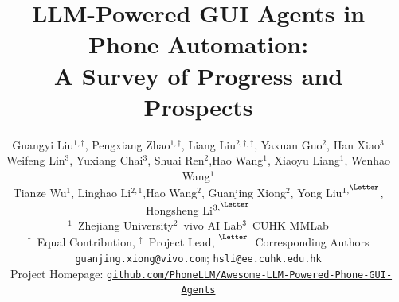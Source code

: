 \documentclass[10pt,journal, compsoc]{IEEEtran}
\begin{document}
\title{LLM-Powered GUI Agents in Phone Automation: \\A Survey of Progress and Prospects} 



\author{Guangyi Liu$^{1,\dag}$, Pengxiang Zhao$^{1,\dag}$, Liang Liu$^{2,\dag,\ddag}$, Yaxuan Guo$^2$, Han Xiao$^{3}$\\[-0.2ex]
Weifeng Lin$^{3}$, Yuxiang Chai$^{3}$, Shuai Ren$^2$,Hao Wang$^1$, Xiaoyu Liang$^1$, Wenhao Wang$^1$\\[-0.2ex] 
Tianze Wu$^1$, Linghao Li$^{2,1}$,Hao Wang$^2$, Guanjing Xiong$^2$, Yong Liu$^{1,\textsuperscript{\Letter}}$, Hongsheng Li$^{3,\textsuperscript{\Letter}}$  \\
\normalsize{$^1$~Zhejiang University\quad$^2$~vivo AI Lab\quad$^3$~CUHK MMLab} \\
\small{$^\dag$~Equal Contribution, \quad $^\ddag$~Project Lead, \quad $^{\textsuperscript{\Letter}}$~Corresponding Authors} \\
\texttt{\small guanjing.xiong@vivo.com}; \texttt{\small hsli@ee.cuhk.edu.hk}\quad\\\
\small{Project Homepage: }\href{https://github.com/PhoneLLM/Awesome-LLM-Powered-Phone-GUI-Agents}{\texttt{\small github.com/PhoneLLM/Awesome-LLM-Powered-Phone-GUI-Agents}} 
}





\end{document}
